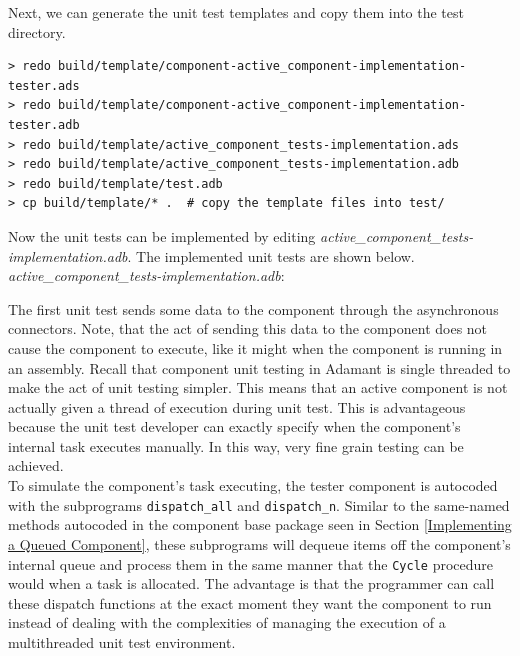 Next, we can generate the unit test templates and copy them into the test directory.

\vspace{5mm} %
\begin{verbatim}
> redo build/template/component-active_component-implementation-tester.ads
> redo build/template/component-active_component-implementation-tester.adb
> redo build/template/active_component_tests-implementation.ads
> redo build/template/active_component_tests-implementation.adb
> redo build/template/test.adb
> cp build/template/* .  # copy the template files into test/
\end{verbatim}
\vspace{5mm} %

Now the unit tests can be implemented by editing \textit{active\_component\_tests-implementation.adb}. The implemented unit tests are shown below. \\

\textit{active\_component\_tests-implementation.adb}:

The first unit test sends some data to the component through the asynchronous connectors. Note, that the act of sending this data to the component does not cause the component to execute, like it might when the component is running in an assembly. Recall that component unit testing in Adamant is single threaded to make the act of unit testing simpler. This means that an active component is not actually given a thread of execution during unit test. This is advantageous because the unit test developer can exactly specify when the component's internal task executes manually. In this way, very fine grain testing can be achieved. \\

To simulate the component's task executing, the tester component is autocoded with the subprograms \texttt{dispatch\_all} and \texttt{dispatch\_n}. Similar to the same-named methods autocoded in the component base package seen in Section \ref{Implementing a Queued Component}, these subprograms will dequeue items off the component's internal queue and process them in the same manner that the \texttt{Cycle} procedure would when a task is allocated. The advantage is that the programmer can call these dispatch functions at the exact moment they want the component to run instead of dealing with the complexities of managing the execution of a multithreaded unit test environment. \\

